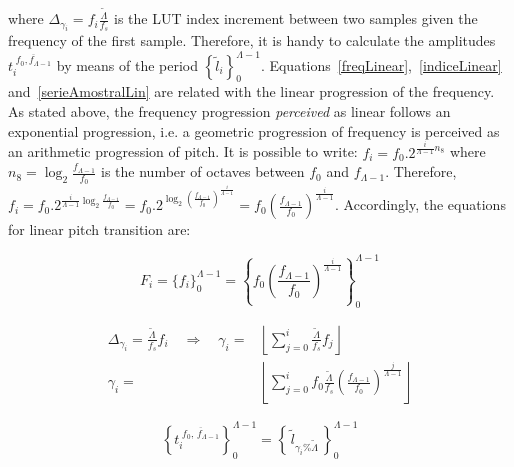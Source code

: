 \noindent where $\Delta_{\gamma_i}=f_i\frac{\widetilde{\Lambda}}{f_s}$ is the LUT index increment between two samples given the frequency of the first sample. Therefore, it is handy to calculate the amplitudes $t_i^{\;\overline{f_0,f_{\Lambda-1}}}$ by means of the period $\left\{\widetilde{l}_i\right\}_0^{\Lambda-1}$. Equations~\ref{freqLinear},~\ref{indiceLinear} and~\ref{serieAmostralLin} are related with the linear progression of the frequency. As stated above, the frequency progression \emph{perceived} as linear follows an exponential progression, i.e. a geometric progression of frequency is perceived as an arithmetic progression of pitch. It is possible to write: $f_i=f_0 . 2^{\frac{i}{\Lambda-1} n_8}$ where $n_8=\log_2\frac{f_{\Lambda-1}}{f_0}$ is the number of octaves between $f_0$ and $f_{\Lambda-1}$.
Therefore, $f_i=f_0 . 2^{\frac{i}{\Lambda-1}\log_2\frac{f_{\Lambda-1}}{f_0}}=
 f_0 . 2^{\log_2\left ( \frac{f_{\Lambda-1}}{f_0} \right )^{\frac{i}{\Lambda-1}}}=
 f_0 \left ( \frac{f_{\Lambda-1}}{f_0} \right ) ^{\frac{i}{\Lambda -1}}$. Accordingly, the equations for linear pitch transition are:

\begin{equation}\label{freqExponencial}
 F_i=\{f_i\}_0^{\Lambda-1}=  \left\{f_0 \left ( \frac{f_{\Lambda-1}}{f_0} \right ) ^{\frac{i}{\Lambda -1}} \right\}_0^{\Lambda-1}
\end{equation}

\begin{equation}\label{indiceExponencial}
\begin{split}
 \Delta_{\gamma_i}= \frac{\widetilde{\Lambda}}{f_s}f_i \quad \Rightarrow  \quad \gamma_i= & \left \lfloor \sum_{j=0}^{i} \frac{\widetilde{\Lambda}}{f_s}f_j \right \rfloor \\
	\gamma_i = & \left \lfloor \sum_{j=0}^{i} f_0 \frac{\widetilde{\Lambda}}{f_s} \left ( \frac{f_{\Lambda-1}}{f_0} \right ) ^{\frac{j}{\Lambda -1}} \right \rfloor
\end{split}
\end{equation}

\begin{equation}\label{serieAmostralLog}
 \left\{t_i^{\;\overline{f_0,\,f_{\Lambda-1}}}\right\}_0^{\Lambda-1}=\left\{\,\widetilde{l}_{\gamma_i \% \widetilde{\Lambda}}\,\right\}_0^{\Lambda-1}
\end{equation}


